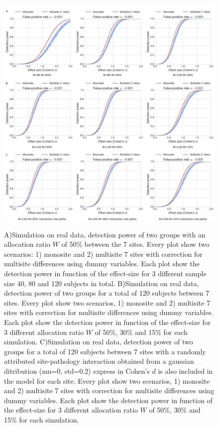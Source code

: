 \documentclass[authoryear]{elsarticle}
\begin{document}
\begin{figure}[tbp]
\centering
\captionsetup[subfloat]{labelformat=empty}
{\includegraphics[width=\textwidth]{../figures/simulations_real_7sites.png}}

\caption{
A)Simulation on real data, detection power of two groups with an allocation ratio $W$ of 50\% between the 7 sites. Every plot show two scenarios: 1) monosite and 2) multisite 7 sites with correction for multisite differences using dummy variables. Each plot show the detection power in function of the effect-size for 3 different sample size 40, 80 and 120 subjects in total.
B)Simulation on real data, detection power of two groups for a total of 120 subjects between 7 sites. Every plot show two scenarios, 1) monosite and 2) multisite 7 sites with correction for multisite differences using dummy variables. Each plot show the detection power in function of the effect-size for 3 different allocation ratio $W$ of 50\%, 30\% and 15\% for each simulation.
C)Simulation on real data, detection power of two groups for a total of 120 subjects between 7 sites with a randomly attributed site-pathology interaction obtained from a gaussian ditribution (mu=0, std=0.2) express in Cohen’s $d$ is also included in the model for each site. Every plot show two scenarios, 1) monosite and 2) multisite 7 sites with correction for multisite differences using dummy variables. Each plot show the detection power in function of the effect-size for 3 different allocation ratio $W$ of 50\%, 30\% and 15\% for each simulation.
}
\label{fig_real_sim}
\end{figure}
\end{document}
